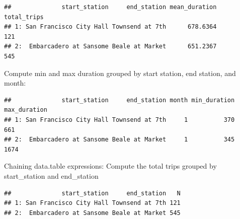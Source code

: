 \documentclass[]{book}
\newenvironment{Shaded}{\begin{snugshade}}{\end{snugshade}}
\newcommand{\DataTypeTok}[1]{\textcolor[rgb]{0.13,0.29,0.53}{#1}}
\newcommand{\DecValTok}[1]{\textcolor[rgb]{0.00,0.00,0.81}{#1}}
\newcommand{\KeywordTok}[1]{\textcolor[rgb]{0.13,0.29,0.53}{\textbf{#1}}}
\newcommand{\NormalTok}[1]{#1}
\newcommand{\OperatorTok}[1]{\textcolor[rgb]{0.81,0.36,0.00}{\textbf{#1}}}
\newcommand{\StringTok}[1]{\textcolor[rgb]{0.31,0.60,0.02}{#1}}
\begin{document}
\begin{verbatim}
##              start_station     end_station mean_duration total_trips
## 1: San Francisco City Hall Townsend at 7th      678.6364         121
## 2:  Embarcadero at Sansome Beale at Market      651.2367         545
\end{verbatim}

Compute min and max duration grouped by start station, end station, and month:

\begin{Shaded}
\end{Shaded}

\begin{verbatim}
##              start_station     end_station month min_duration max_duration
## 1: San Francisco City Hall Townsend at 7th     1          370          661
## 2:  Embarcadero at Sansome Beale at Market     1          345         1674
\end{verbatim}

Chaining data.table expressions:
Compute the total trips grouped by start\_station and end\_station

\begin{Shaded}
\end{Shaded}

\begin{verbatim}
##              start_station     end_station   N
## 1: San Francisco City Hall Townsend at 7th 121
## 2:  Embarcadero at Sansome Beale at Market 545
\end{verbatim}
\end{document}
